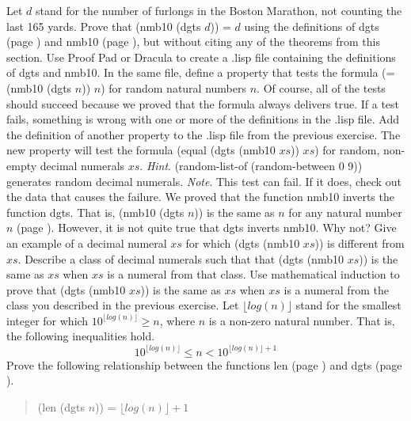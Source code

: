 \begin{ExerciseList}
\Exercise Let $d$ stand for the number of furlongs in
     the Boston Marathon, not counting the last 165 yards.
     Prove that (nmb10 (dgts $d$)) = $d$
     using the definitions of dgts (page \pageref{dgts-defun})
     and nmb10 (page \pageref{nmb10-defun}),
     but without citing any of the theorems from this section.
\Exercise Use Proof Pad or Dracula to create a .lisp file containing the
     definitions of dgts and nmb10.
     In the same file, define a property that tests
     the formula (= (nmb10 (dgts $n$)) $n$) for random
     natural numbers $n$.
     Of course, all of the tests should succeed because
     we proved that the formula always delivers true.
     If a test fails, something is wrong with one or more
     of the definitions in the .lisp file.
\Exercise Add the definition of another property to
     the .lisp file from the previous exercise.
     The new property will test the formula
     (equal (dgts (nmb10 $xs$)) $xs$) for random, non-empty
     decimal numerals $xs$.
     \emph{Hint}. (random-list-of (random-between 0 9))
     generates random decimal numerals.
     \emph{Note}. This test can fail.
     If it does, check out the data that causes the failure.
\Exercise We proved that the function nmb10
     inverts the function dgts.
     That is, (nmb10 (dgts $n$)) is the same as $n$
     for any natural number $n$ (page \pageref{dgts-ok}).
     However, it is not quite true that dgts inverts nmb10.
     Why not? Give an example of a decimal numeral
     $xs$ for which (dgts (nmb10 $xs$)) is different from $xs$.
\Exercise Describe a class of decimal numerals such that
     that (dgts (nmb10 $xs$)) is the same as $xs$
     when $xs$ is a numeral from that class.
\Exercise Use mathematical induction to prove that
    (dgts (nmb10 $xs$)) is the same as $xs$
     when $xs$ is a numeral from the class
     you described in the previous exercise.
\Exercise Let $\lfloor log(n) \rfloor$ stand for the
    smallest integer for which $10^{\lfloor log(n) \rfloor} \ge n$,
    where $n$ is a non-zero natural number.
    That is, the following inequalities hold.
\begin{displaymath}
  10^{\lfloor log(n) \rfloor} \le n < 10^{\lfloor log(n) \rfloor + 1}
\end{displaymath}
    Prove the following relationship between the functions
    len (page \pageref{len-equations}) and dgts (page \pageref{dgts-defun}).
\begin{quote}
    (len (dgts $n$)) = $\lfloor log(n) \rfloor + 1$
\end{quote}

\end{ExerciseList}


